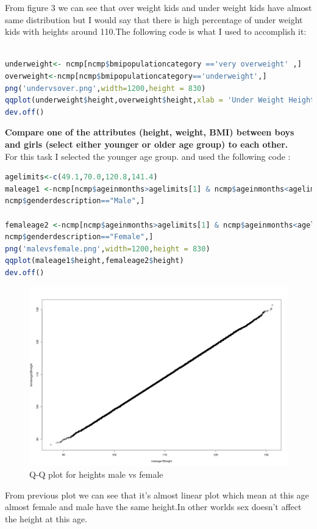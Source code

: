 \documentclass{article}
\begin{document}
From figure 3 we can see that over weight kids and under weight kids have almost same distribution but I would say that there is high percentage of under weight kids with heights around 110.The following code is what I used to accomplish it:
\begin{lstlisting}[language=R]

underweight<- ncmp[ncmp$bmipopulationcategory =='very overweight' ,]
overweight<-ncmp[ncmp$bmipopulationcategory=='underweight',]
png('undervsover.png',width=1200,height = 830)
qqplot(underweight$height,overweight$height,xlab = 'Under Weight Height',ylab = 'Over weight height')
dev.off()
\end{lstlisting}
\textbf{Compare one of the attributes (height, weight, BMI) between boys and girls (select either younger or older age group) to each other. }\\
For this task I selected the younger age group. and used the following code :
\begin{lstlisting}[language=R]
agelimits<-c(49.1,70.0,120.8,141.4)
maleage1 <-ncmp[ncmp$ageinmonths>agelimits[1] & ncmp$ageinmonths<agelimits[2]&
ncmp$genderdescription=="Male",]

femaleage2 <-ncmp[ncmp$ageinmonths>agelimits[1] & ncmp$ageinmonths<agelimits[2]&
ncmp$genderdescription=="Female",]
png('malevsfemale.png',width=1200,height = 830)
qqplot(maleage1$height,femaleage2$height)
dev.off()
\end{lstlisting}
\begin{figure}[H]
\includegraphics[scale=0.4]{malevsfemale.png}
\caption{Q-Q plot for heights male vs female}
\end{figure}
From previous plot we can see that it's almost linear plot which mean at this age almost female and male have the same height.In other worlds sex doesn't affect the height at this age.
\end{document}
